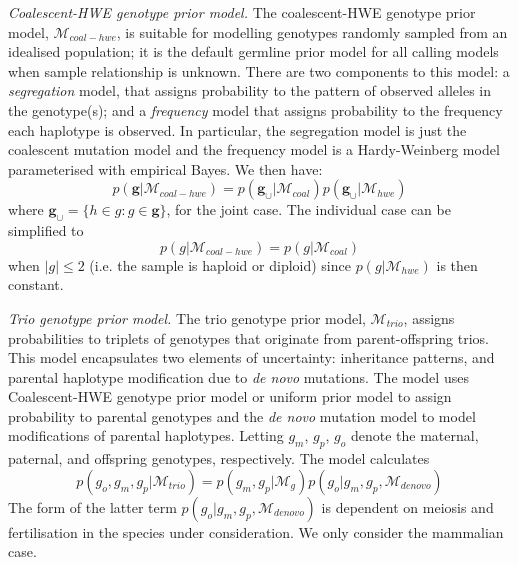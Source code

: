 \documentclass[notitlepage, twocolumn, 10pt]{article}
\begin{document}
\vspace{3mm}
\noindent\emph{Coalescent-HWE genotype prior model.} The coalescent-HWE genotype prior model, $\mathcal{M}_{coal-hwe}$, is suitable for modelling genotypes randomly sampled from an idealised population; it is the default germline prior model for all calling models when sample relationship is unknown. There are two components to this model: a \emph{segregation} model, that assigns probability to the pattern of observed alleles in the genotype(s); and a \emph{frequency} model that assigns probability to the frequency each haplotype is observed. In particular, the segregation model is just the coalescent mutation model and the frequency model is a Hardy-Weinberg model parameterised with empirical Bayes. We then have:
\begin{equation*}
    p(\boldsymbol{g} | \mathcal{M}_{coal-hwe}) = p(\boldsymbol{g}_{\cup} | \mathcal{M}_{coal}) p(\boldsymbol{g}_{\cup} | \mathcal{M}_{hwe})
\end{equation*}
where $\boldsymbol{g}_{\cup} = \{h \in g : g \in \boldsymbol{g}\}$, for the joint case. The individual case can be simplified to
\begin{equation*}
    p(g | \mathcal{M}_{coal-hwe}) = p(g | \mathcal{M}_{coal})
\end{equation*}
when $|g| \le 2$ (i.e. the sample is haploid or diploid) since $p(g | \mathcal{M}_{hwe})$ is then constant.

\vspace{3mm}
\noindent\emph{Trio genotype prior model.} The trio genotype prior model, $\mathcal{M}_{trio}$, assigns probabilities to triplets of genotypes that originate from parent-offspring trios. This model encapsulates two elements of uncertainty: inheritance patterns, and parental haplotype modification due to \textit{de novo} mutations. The model uses Coalescent-HWE genotype prior model or uniform prior model to assign probability to parental genotypes and the \emph{de novo} mutation model to model modifications of parental haplotypes. Letting $g_m$, $g_p$, $g_o$ denote the maternal, paternal, and offspring genotypes, respectively. The model calculates
\begin{equation*}
    p(g_o, g_m, g_p | \mathcal{M}_{trio}) = p(g_m, g_p | \mathcal{M}_{g}) p(g_o | g_m, g_p, \mathcal{M}_{denovo})
\end{equation*}
The form of the latter term $p(g_o | g_m, g_p, \mathcal{M}_{denovo})$ is dependent on meiosis and fertilisation in the species under consideration. We only consider the mammalian case.
\end{document}
